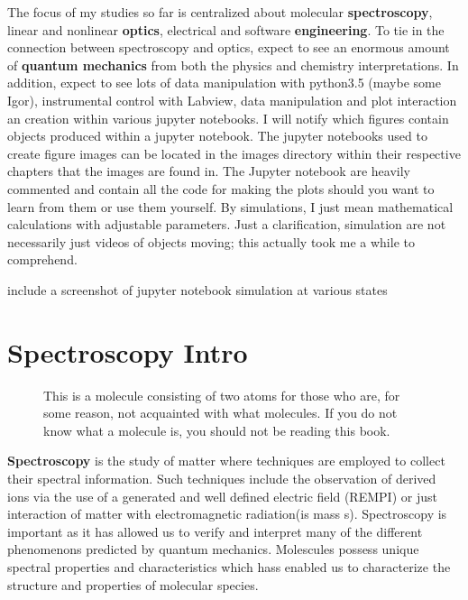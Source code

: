 \documentclass[11pt,a4paper]{book}
\newcommand{\imginput}[1]{} %
\begin{document}
	The focus of my studies so far is centralized about molecular {\bfseries spectroscopy}, linear and nonlinear {\bfseries optics}, electrical and software {\bfseries engineering}. To tie in the connection between spectroscopy and optics, expect to see an enormous amount of {\bfseries quantum mechanics} from both the physics and chemistry interpretations. In addition, expect to see lots of data manipulation with python3.5 (maybe some Igor), instrumental control with Labview, data manipulation and plot interaction an creation within various jupyter notebooks. I will notify which figures contain objects produced within a jupyter notebook. The jupyter notebooks used to create figure images can be located in the images directory within their respective chapters that the images are found in. The Jupyter notebook are heavily commented and contain all the code for making the plots should you want to learn from them or use them yourself. By simulations, I just mean mathematical calculations with adjustable parameters. Just a clarification, simulation are not necessarily just videos of objects moving; this actually took me a while to comprehend.
	
	include a screenshot of jupyter notebook simulation at various states
	\section{Spectroscopy Intro}
		\label{sec:Spectroscopy Intro}
		\begin{figure} [!ht]
			\centering
			\def\svgwidth{\columnwidth}
			\huge
			\resizebox{8cm}{!}{\imginput{images/molecule.pdf_tex}}
			\caption{This is a molecule consisting of two atoms for those who are, for some reason, not acquainted with what molecules. If you do not know what a molecule is, you should not be reading this book.}
			\label{fig:molecule-alpha}
		\end{figure}
		
		{\bfseries Spectroscopy} is the study of matter where techniques are employed to collect their spectral information. Such techniques include the observation of derived ions via the use of a generated and well defined electric field (REMPI) or just interaction of matter with electromagnetic radiation(is mass s). Spectroscopy is important as it has allowed us to verify and interpret many of the different phenomenons predicted by quantum mechanics. Molescules possess unique spectral properties and characteristics which hass enabled us to characterize the structure and properties of molecular species. 
		
\end{document}
